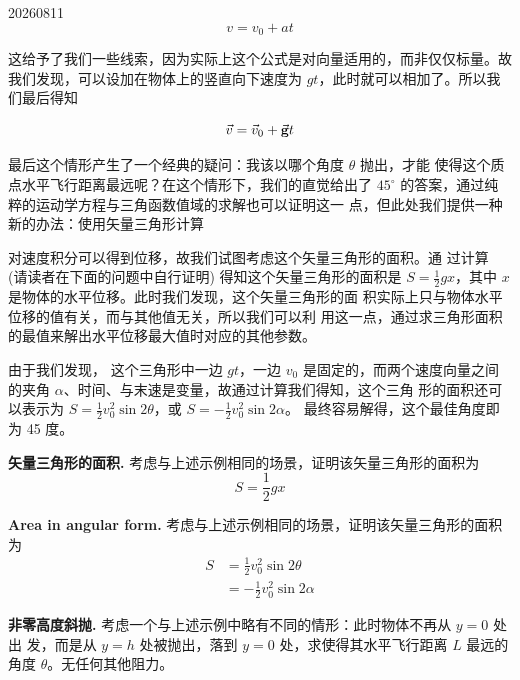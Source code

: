 \begin{problem}{20260811}
\[ v = v_0 + a t \]

这给予了我们一些线索，因为实际上这个公式是对向量适用的，而非仅仅标量。故我们发现，可以设加在物体上的竖直向下速度为 $g t$，此时就可以相加了。所以我们最后得知

\[ \vec v = \vec v_0 + \vec{\mathbf{g}} t \]

最后这个情形产生了一个经典的疑问：我该以哪个角度 $\theta$ 抛出，才能 使得这个质点水平飞行距离最远呢？在这个情形下，我们的直觉给出了 $45^\circ$ 的答案，通过纯粹的运动学方程与三角函数值域的求解也可以证明这一 点，但此处我们提供一种新的办法：使用矢量三角形计算

对速度积分可以得到位移，故我们试图考虑这个矢量三角形的面积。通 过计算 (请读者在下面的问题中自行证明) 得知这个矢量三角形的面积是 $S = \frac 1 2 g x$，其中 $x$ 是物体的水平位移。此时我们发现，这个矢量三角形的面 积实际上只与物体水平位移的值有关，而与其他值无关，所以我们可以利 用这一点，通过求三角形面积的最值来解出水平位移最大值时对应的其他参数。

由于我们发现， 这个三角形中一边 $g t$，一边 $v_0$ 是固定的，而两个速度向量之间的夹角 $\alpha$、时间、与末速是变量，故通过计算我们得知，这个三角
形的面积还可以表示为 $S = \frac 1 2 v^2_0 \sin {2 \theta}$，或 $S = - \frac 1 2 v^2_0 \sin {2 \alpha}$。
最终容易解得，这个最佳角度即为 45 度。

\newpage

\begin{questions}
  \item \textbf{矢量三角形的面积.}
    考虑与上述示例相同的场景，证明该矢量三角形的面积为
    \[ S = \frac 1 2 g x \]

  \item \textbf{Area in angular form.}
  考虑与上述示例相同的场景，证明该矢量三角形的面积为
  \[ 
  \begin{aligned}
  S &= \frac 1 2 v_0^2 \sin {2 \theta}  \\
  &= - \frac 1 2 v_0^2 \sin {2 \alpha}
  \end{aligned}
  \]

  \item \textbf{非零高度斜抛.}
  考虑一个与上述示例中略有不同的情形：此时物体不再从 $y=0$ 处出 发，而是从 $y=h$ 处被抛出，落到 $y=0$ 处，求使得其水平飞行距离 $L$ 最远的 角度 $\theta$。无任何其他阻力。
\end{questions}

\end{problem}

